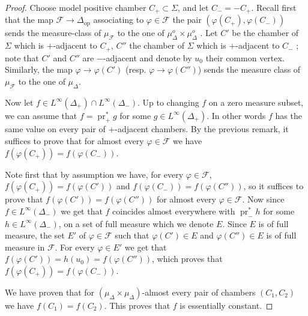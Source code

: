 \documentclass[a4paper, 11pt]{article}
\theoremstyle{plain}
\theoremstyle{definition}
\theoremstyle{remark}
\DeclareMathOperator{\proj}{proj}
\DeclareMathOperator{\pr}{pr}
\newcommand{\scrF}{\mathscr F}
\newcommand{\op}{\mathrm{op}}
\begin{document}
\begin{proof}
Choose model positive chamber $C_+\subset \Sigma$, and let $C_-=-C_+$. Recall first that the map $\scrF\to \Delta_{\op}$ associating to $\varphi\in \scrF$ the pair $(\varphi(C_+),\varphi(C_-))$ sends the  measure-class of $\mu_\scrF$ to the one of $\mu_\Delta^o\times\mu_\Delta^o$  \cite[Theorem 6.21]{BCL}. Let $C'$ be the chamber of $\Sigma$ which is $+$-adjacent to $C_+$, $C''$ the chamber of $\Sigma$ which is $+$-adjacent to $C_-$ ; note that $C'$ and $C''$ are $-$-adjacent and denote by $u_0$ their common vertex. Similarly, the map $\varphi\to \varphi(C')$ (resp. $\varphi\to \varphi(C'')$) sends the measure class of $\mu_\scrF$ to the one of $\mu_\Delta$.


Now let $f\in L^\infty(\Delta_+)\cap L^\infty(\Delta_-)$. Up to changing $f$ on a zero measure subset, we can assume that $f=\pr_+^* g$ for some $g\in L^\infty(\Delta_+)$.  In other words $f$ has the same value on every pair of $+$-adjacent chambers. 
By the previous remark, it suffices to prove that for almost every $\varphi\in \scrF$ we have $f(\varphi(C_+)) = f(\varphi(C_-))$. 

Note first that by assumption we have, for every $\varphi\in\scrF$, $f(\varphi(C_+))=f(\varphi(C')) $ and $f(\varphi(C_-))= f(\varphi(C''))$, so it suffices to prove that $f(\varphi(C'))=f(\varphi(C''))$ for almost every $\varphi\in \scrF$. Now since $f\in L^\infty(\Delta_-)$ we get that $f$ coincides almost everywhere with $\pr_-^*h$ for some $h\in L^\infty(\Delta_-)$, on a set of full measure which we denote $E$. Since $E$ is of full measure, the set $E'$ of $\varphi\in \scrF$ such that $\varphi(C')\in E$ and $\varphi(C'')\in E$ is of full measure in $\scrF$. For every $\varphi\in E'$ we get that $f(\varphi(C'))=h(u_0) = f(\varphi(C''))$, which proves that $f(\varphi(C_+))=f(\varphi(C_-))$.

We have proven that for $(\mu_\Delta\times\mu_\Delta)$-almost every pair of chambers $(C_1,C_2)$ we have $f(C_1)=f(C_2)$. This proves that $f$ is essentially constant.




\end{proof}
\end{document}
